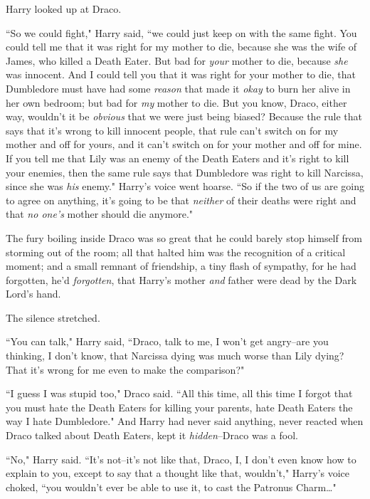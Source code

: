 Harry looked up at Draco.

``So we could fight," Harry said, ``we could just keep on with the same fight. You could tell me that it was right for my mother to die, because she was the wife of James, who killed a Death Eater. But bad for \emph{your} mother to die, because \emph{she} was innocent. And I could tell you that it was right for your mother to die, that Dumbledore must have had some \emph{reason} that made it \emph{okay} to burn her alive in her own bedroom; but bad for \emph{my} mother to die. But you know, Draco, either way, wouldn't it be \emph{obvious} that we were just being biased? Because the rule that says that it's wrong to kill innocent people, that rule can't switch on for my mother and off for yours, and it can't switch on for your mother and off for mine. If you tell me that Lily was an enemy of the Death Eaters and it's right to kill your enemies, then the same rule says that Dumbledore was right to kill Narcissa, since she was \emph{his} enemy." Harry's voice went hoarse. ``So if the two of us are going to agree on anything, it's going to be that \emph{neither} of their deaths were right and that \emph{no one's} mother should die anymore."

\later

The fury boiling inside Draco was so great that he could barely stop himself from storming out of the room; all that halted him was the recognition of a critical moment; and a small remnant of friendship, a tiny flash of sympathy, for he had forgotten, he'd \emph{forgotten}, that Harry's mother \emph{and} father were dead by the Dark Lord's hand.

The silence stretched.

``You can talk," Harry said, ``Draco, talk to me, I won't get angry\---are you thinking, I don't know, that Narcissa dying was much worse than Lily dying? That it's wrong for me even to make the comparison?"

``I guess I was stupid too," Draco said. ``All this time, all this time I forgot that you must hate the Death Eaters for killing your parents, hate Death Eaters the way I hate Dumbledore." And Harry had never said anything, never reacted when Draco talked about Death Eaters, kept it \emph{hidden}\---Draco was a fool.

``No," Harry said. ``It's not\---it's not like that, Draco, I, I don't even know how to explain to you, except to say that a thought like that, wouldn't," Harry's voice choked, ``you wouldn't ever be able to use it, to cast the Patronus Charm{\ldots}"

